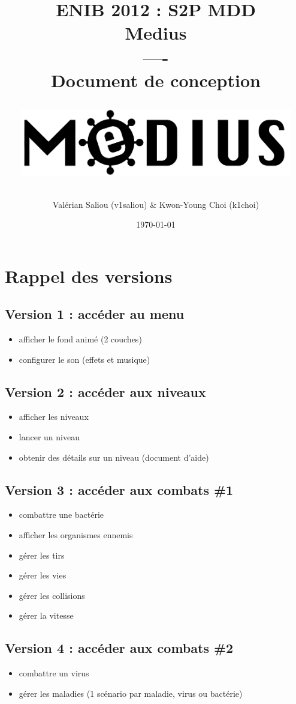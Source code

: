 \documentclass{article}
\title{{\Huge \bf ENIB 2012 : S2P  MDD} \\
\vspace*{2cm}
{\Huge \bf Medius} \\----\\ Document de conception \\
\vspace*{2cm}
\centerline{\includegraphics[height=3cm]{logomedius.jpg}}
}
\author{Valérian Saliou (v1saliou) \& Kwon-Young Choi (k1choi)}
\date\today
\begin{document}
\maketitle

\newpage

\section{Rappel des versions}

\subsection{Version 1 : accéder au menu}
\begin{itemize}
\item afficher le fond animé (2 couches)
\item configurer le son (effets et musique)
\end{itemize}

\subsection{Version 2 : accéder aux niveaux}
\begin{itemize}
\item afficher les niveaux
\item lancer un niveau
\item obtenir des détails sur un niveau (document d'aide)
\end{itemize}

\subsection{Version 3 : accéder aux combats \#1}
\begin{itemize}
\item combattre une bactérie
\item afficher les organismes ennemis
\item gérer les tirs
\item gérer les vies
\item gérer les collisions
\item gérer la vitesse
\end{itemize}

\subsection{Version 4 : accéder aux combats \#2}
\begin{itemize}
\item combattre un virus
\item gérer les maladies (1 scénario par maladie, virus ou bactérie)
\end{itemize}
\newpage
\end{document}
